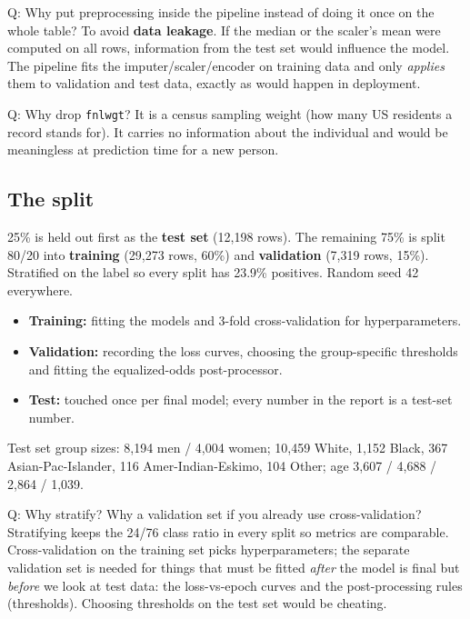 \documentclass[11pt,a4paper]{article}
\begin{document}
\begin{qa}{Q: Why put preprocessing inside the pipeline instead of doing it once on the whole table?}
To avoid \textbf{data leakage}. If the median or the scaler's mean were computed on all rows, information from the test set would influence the model. The pipeline fits the imputer/scaler/encoder on training data and only \emph{applies} them to validation and test data, exactly as would happen in deployment.
\end{qa}

\begin{qa}{Q: Why drop \texttt{fnlwgt}?}
It is a census sampling weight (how many US residents a record stands for). It carries no information about the individual and would be meaningless at prediction time for a new person.
\end{qa}

\subsection{The split}
25\% is held out first as the \textbf{test set} (12,198 rows). The remaining 75\% is split 80/20 into \textbf{training} (29,273 rows, 60\%) and \textbf{validation} (7,319 rows, 15\%). Stratified on the label so every split has 23.9\% positives. Random seed 42 everywhere.

\begin{itemize}
  \item \textbf{Training:} fitting the models and 3-fold cross-validation for hyperparameters.
  \item \textbf{Validation:} recording the loss curves, choosing the group-specific thresholds and fitting the equalized-odds post-processor.
  \item \textbf{Test:} touched once per final model; every number in the report is a test-set number.
\end{itemize}
Test set group sizes: 8,194 men / 4,004 women; 10,459 White, 1,152 Black, 367 Asian-Pac-Islander, 116 Amer-Indian-Eskimo, 104 Other; age 3,607 / 4,688 / 2,864 / 1,039.

\begin{qa}{Q: Why stratify? Why a validation set if you already use cross-validation?}
Stratifying keeps the 24/76 class ratio in every split so metrics are comparable. Cross-validation on the training set picks hyperparameters; the separate validation set is needed for things that must be fitted \emph{after} the model is final but \emph{before} we look at test data: the loss-vs-epoch curves and the post-processing rules (thresholds). Choosing thresholds on the test set would be cheating.
\end{qa}
\end{document}
